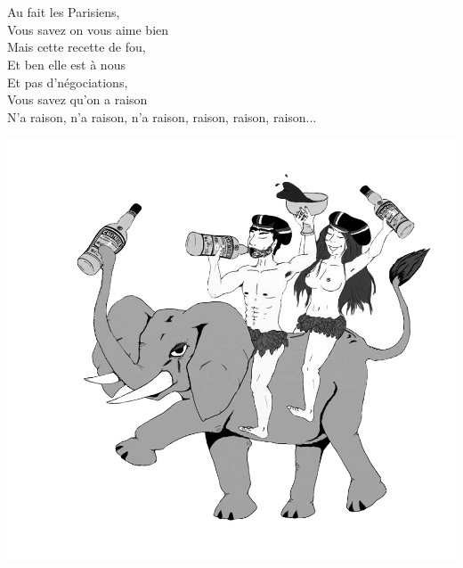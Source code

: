 \\\\Au fait les Parisiens, 
\\Vous savez on vous aime bien
\\Mais cette recette de fou, 
\\Et ben elle est à nous
\\Et pas d'négociations, 
\\Vous savez qu'on a raison
\\N'a raison, n'a raison, n'a raison, raison, raison, raison...
\begin{center}
\includegraphics[width=1\textwidth]{images/chartreuse2.jpg}
\end{center}

\breakpage